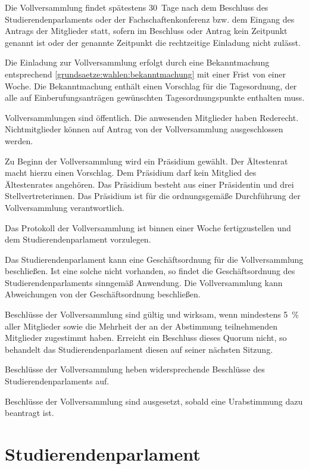 Die Vollversammlung findet spätestens 30~Tage nach dem Beschluss des Studierendenparlaments oder der Fachschaftenkonferenz bzw. dem Eingang des Antrags der Mitglieder statt, sofern im Beschluss oder Antrag kein Zeitpunkt genannt ist oder der genannte Zeitpunkt die rechtzeitige Einladung nicht zulässt.

Die Einladung zur Vollversammlung erfolgt durch eine Bekanntmachung entsprechend \ref{grundsaetze:wahlen:bekanntmachung} mit einer Frist von einer Woche. Die Bekanntmachung enthält einen Vorschlag für die Tagesordnung, der alle auf Einberufungsanträgen gewünschten Tagesordnungspunkte enthalten muss.

Vollversammlungen sind öffentlich. Die anwesenden Mitglieder haben Rederecht. Nichtmitglieder können auf Antrag von der Vollversammlung ausgeschlossen werden.

Zu Beginn der Vollversammlung wird ein Präsidium gewählt. Der Ältestenrat macht hierzu einen Vorschlag. Dem Präsidium darf kein Mitglied des Ältestenrates angehören. Das Präsidium besteht aus einer Präsidentin und drei Stellvertreterinnen. Das Präsidium ist für die ordnungsgemäße Durchführung der Vollversammlung verantwortlich.

Das Protokoll der Vollversammlung ist binnen einer Woche fertigzustellen und dem Studierendenparlament vorzulegen.

Das Studierendenparlament kann eine Geschäftsordnung für die Vollversammlung beschließen. Ist eine solche nicht vorhanden, so findet die Ge\-schäfts\-ord\-nung des Studierendenparlaments sinngemäß Anwendung. Die Vollversammlung kann Abweichungen von der Geschäftsordnung beschließen.




Beschlüsse der Vollversammlung sind gültig und wirksam, wenn mindestens 5~\% aller Mitglieder sowie die Mehrheit der an der Abstimmung teilnehmenden Mitglieder zugestimmt haben. Erreicht ein Beschluss dieses Quorum nicht, so behandelt das Studierendenparlament diesen auf seiner nächsten Sitzung.

Beschlüsse der Vollversammlung heben widersprechende Beschlüsse des Studierendenparlaments auf.

Beschlüsse der Vollversammlung sind ausgesetzt, sobald eine Urabstimmung dazu beantragt ist.


%
%

\parnumberfalse \section{Studierendenparlament} \parnumbertrue

